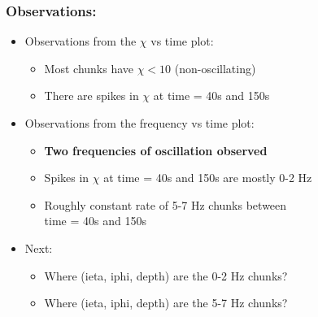 \documentclass[bigger]{beamer}
\providecommand{\alert}[1]{\textbf{#1}}
\begin{document}
\begin{frame}
\frametitle{Observations:}
\label{sec-3-1-3}
\begin{itemize}

\item Observations from the $\chi$ vs time plot:
\label{sec-3-1-3-1}%
\begin{itemize}

\item Most chunks have $\chi < 10$ (non-oscillating)
\label{sec-3-1-3-1-1}%

\item There are spikes in $\chi$ at time = 40s and 150s
\label{sec-3-1-3-1-2}%
\end{itemize} %

\item Observations from the frequency vs time plot:
\label{sec-3-1-3-2}%
\begin{itemize}

\item \alert{Two frequencies of oscillation observed}
\label{sec-3-1-3-2-1}%

\item Spikes in $\chi$ at time = 40s and 150s are mostly 0-2 Hz
\label{sec-3-1-3-2-2}%

\item Roughly constant rate of 5-7 Hz chunks between \\ time = 40s and 150s
\label{sec-3-1-3-2-3}%
\end{itemize} %

\item Next:
\label{sec-3-1-3-3}%
\begin{itemize}

\item Where (ieta, iphi, depth) are the 0-2 Hz chunks?
\label{sec-3-1-3-3-1}%

\item Where (ieta, iphi, depth) are the 5-7 Hz chunks?
\label{sec-3-1-3-3-2}%
\end{itemize} %
\end{itemize} %
\end{frame}
\end{document}

